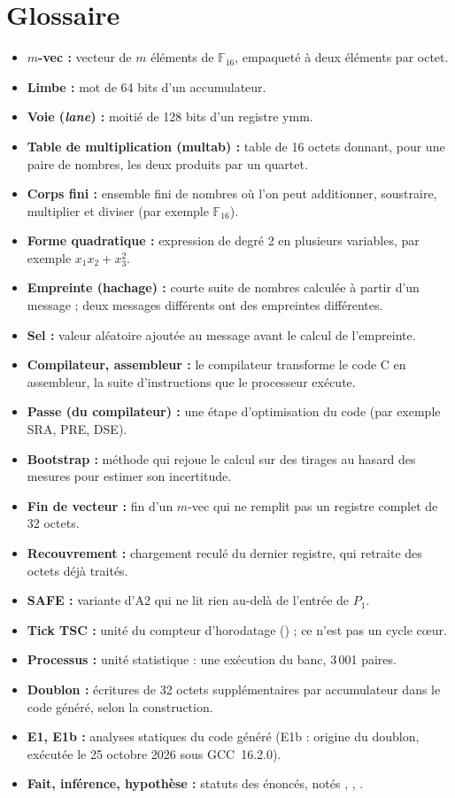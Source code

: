 \chapter*{Glossaire}
\begin{itemize}[leftmargin=0.5cm,itemsep=3pt]
\item \textbf{$m$-vec :} vecteur de $m$ éléments de $\mathbb{F}_{16}$, empaqueté à deux éléments par octet.
\item \textbf{Limbe :} mot de 64 bits d'un accumulateur.
\item \textbf{Voie (\emph{lane}) :} moitié de 128 bits d'un registre ymm.
\item \textbf{Table de multiplication (multab) :} table de 16 octets donnant, pour une paire de nombres, les deux produits par un quartet.
\item \textbf{Corps fini :} ensemble fini de nombres où l'on peut additionner, soustraire, multiplier et diviser (par exemple $\mathbb{F}_{16}$).\item \textbf{Forme quadratique :} expression de degré 2 en plusieurs variables, par exemple $x_1x_2+x_3^2$.\item \textbf{Empreinte (hachage) :} courte suite de nombres calculée à partir d'un message ; deux messages différents ont des empreintes différentes.\item \textbf{Sel :} valeur aléatoire ajoutée au message avant le calcul de l'empreinte.\item \textbf{Compilateur, assembleur :} le compilateur transforme le code C en assembleur, la suite d'instructions que le processeur exécute.\item \textbf{Passe (du compilateur) :} une étape d'optimisation du code (par exemple SRA, PRE, DSE).\item \textbf{Bootstrap :} méthode qui rejoue le calcul sur des tirages au hasard des mesures pour estimer son incertitude.\item \textbf{Fin de vecteur :} fin d'un $m$-vec qui ne remplit pas un registre complet de 32 octets.
\item \textbf{Recouvrement :} chargement reculé du dernier registre, qui retraite des octets déjà traités.
\item \textbf{SAFE :} variante d'A2 qui ne lit rien au-delà de l'entrée de $P_1$.
\item \textbf{Tick TSC :} unité du compteur d'horodatage () ; ce n'est pas un cycle cœur.
\item \textbf{Processus :} unité statistique : une exécution du banc, 3\,001 paires.
\item \textbf{Doublon :} écritures de 32 octets supplémentaires par accumulateur dans le code généré, selon la construction.
\item \textbf{E1, E1b :} analyses statiques du code généré (E1b : origine du doublon, exécutée le 25 octobre 2026 sous GCC~16.2.0).
\item \textbf{Fait, inférence, hypothèse :} statuts des énoncés, notés \F{}, \I{}, \Hy{}.
\end{itemize}
